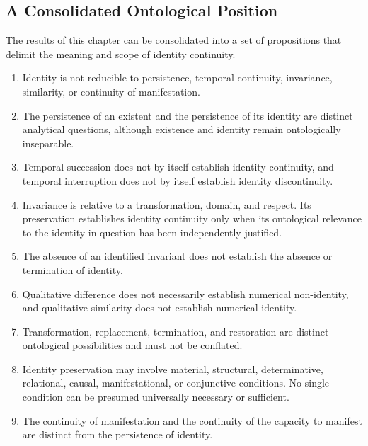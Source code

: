 \subsection{A Consolidated Ontological Position}

The results of this chapter can be consolidated into a set of propositions
that delimit the meaning and scope of identity continuity.

\begin{enumerate}

    \item Identity is not reducible to persistence, temporal continuity,
    invariance, similarity, or continuity of manifestation.

    \item The persistence of an existent and the persistence of its identity
    are distinct analytical questions, although existence and identity
    remain ontologically inseparable.

    \item Temporal succession does not by itself establish identity
    continuity, and temporal interruption does not by itself establish
    identity discontinuity.

    \item Invariance is relative to a transformation, domain, and respect.
    Its preservation establishes identity continuity only when its
    ontological relevance to the identity in question has been independently
    justified.

    \item The absence of an identified invariant does not establish the
    absence or termination of identity.

    \item Qualitative difference does not necessarily establish numerical
    non-identity, and qualitative similarity does not establish numerical
    identity.

    \item Transformation, replacement, termination, and restoration are
    distinct ontological possibilities and must not be conflated.

    \item Identity preservation may involve material, structural,
    determinative, relational, causal, manifestational, or conjunctive
    conditions. No single condition can be presumed universally necessary
    or sufficient.

    \item The continuity of manifestation and the continuity of the
    capacity to manifest are distinct from the persistence of identity.


\end{enumerate}
